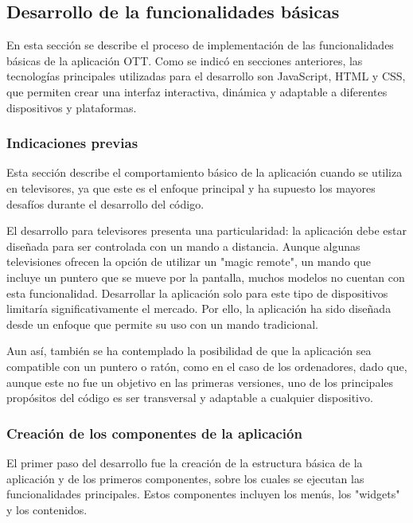 \subsection{Desarrollo de la funcionalidades básicas}
\label{sec:desarrollo_funcionalidades_basicas}

En esta sección se describe el proceso de implementación de las funcionalidades básicas de la aplicación OTT. Como 
se indicó en secciones anteriores, las tecnologías principales utilizadas para el desarrollo son JavaScript, HTML y CSS, 
que permiten crear una interfaz interactiva, dinámica y adaptable a diferentes dispositivos y plataformas.

\subsubsection{Indicaciones previas}
\label{sec:indicaciones_previas}

Esta sección describe el comportamiento básico de la aplicación cuando se utiliza en televisores, ya que este es el enfoque principal y ha supuesto 
los mayores desafíos durante el desarrollo del código.

El desarrollo para televisores presenta una particularidad: la aplicación debe estar diseñada para ser controlada con un mando a distancia. Aunque 
algunas televisiones ofrecen la opción de utilizar un "magic remote", un mando que incluye un puntero que se mueve por la pantalla, muchos modelos no cuentan 
con esta funcionalidad. Desarrollar la aplicación solo para este tipo de dispositivos limitaría significativamente el mercado. Por ello, la aplicación 
ha sido diseñada desde un enfoque que permite su uso con un mando tradicional.

Aun así, también se ha contemplado la posibilidad de que la aplicación sea compatible con un puntero o ratón, como en el caso de los ordenadores, 
dado que, aunque este no fue un objetivo en las primeras versiones, uno de los principales propósitos del código es ser transversal y adaptable a 
cualquier dispositivo.

\subsubsection{Creación de los componentes de la aplicación}
\label{sec:creacion_componentes_aplicacion}

El primer paso del desarrollo fue la creación de la estructura básica de la aplicación y de los primeros componentes, sobre los cuales se ejecutan 
las funcionalidades principales. Estos componentes incluyen los menús, los "widgets" y los contenidos.

